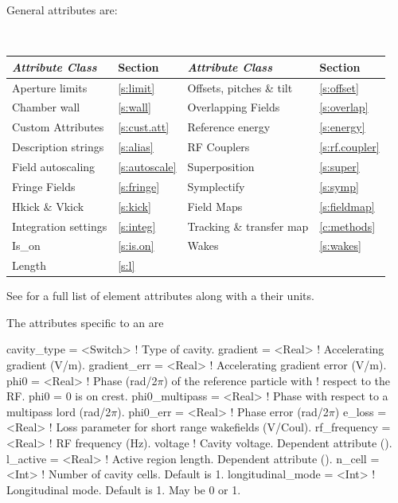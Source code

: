General  attributes are:
\begin{center}
\tt
\begin{tabular}{llll} \toprule
  {\sl Attribute Class}      & Section           & {\sl Attribute Class}      & Section            \\ \midrule
  Aperture limits            & \ref{s:limit}     & Offsets, pitches \& tilt   & \ref{s:offset}     \\
  Chamber wall               & \ref{s:wall}      & Overlapping Fields         & \ref{s:overlap}    \\
  Custom Attributes          & \ref{s:cust.att}  & Reference energy           & \ref{s:energy}     \\ 
  Description strings        & \ref{s:alias}     & RF Couplers                & \ref{s:rf.coupler} \\
  Field autoscaling          & \ref{s:autoscale} & Superposition              & \ref{s:super}      \\
  Fringe Fields              & \ref{s:fringe}    & Symplectify                & \ref{s:symp}       \\
  Hkick \& Vkick             & \ref{s:kick}      & Field Maps                 & \ref{s:fieldmap}   \\
  Integration settings       & \ref{s:integ}     & Tracking \& transfer map   & \ref{c:methods}    \\
  Is_on                      & \ref{s:is.on}     & Wakes                      & \ref{s:wakes}      \\
  Length                     & \ref{s:l}         &                            &                    \\
  \bottomrule
\end{tabular}
\end{center}
\toffset
See  for a full list of element attributes along with a their units.

The attributes specific to an  are 
\begin{example}
  cavity_type     = <Switch>  ! Type of cavity.
  gradient        = <Real>    ! Accelerating gradient (V/m).
  gradient_err    = <Real>    ! Accelerating gradient error (V/m).
  phi0            = <Real>    ! Phase (rad/2\(\pi\)) of the reference particle with 
                              !   respect to the RF. phi0 = 0 is on crest.
  phi0_multipass  = <Real>    ! Phase with respect to a multipass lord (rad/2\(\pi\)).
  phi0_err        = <Real>    ! Phase error (rad/2\(\pi\))
  e_loss          = <Real>    ! Loss parameter for short range wakefields (V/Coul).
  rf_frequency    = <Real>    ! RF frequency (Hz).
  voltage                     ! Cavity voltage. Dependent attribute ().
  l_active        = <Real>    ! Active region length. Dependent attribute ().
  n_cell          = <Int>     ! Number of cavity cells. Default is 1.
  longitudinal_mode = <Int>   ! Longitudinal mode. Default is 1. May be 0 or 1.
\end{example}

